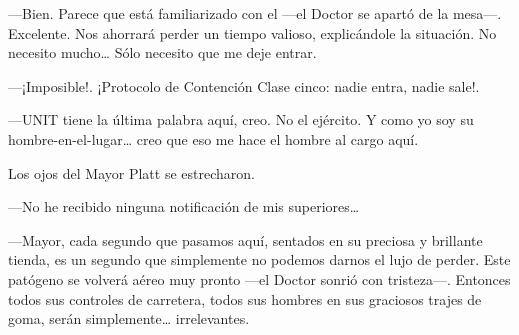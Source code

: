 ---Bien. Parece que está familiarizado con el ---el Doctor se apartó de
la mesa---. Excelente. Nos ahorrará perder un tiempo valioso,
explicándole la situación. No necesito mucho\ldots{} Sólo necesito que
me deje entrar.

---¡Imposible!. ¡Protocolo de Contención Clase cinco: nadie entra, nadie
sale!.

---UNIT tiene la última palabra aquí, creo. No el ejército. Y como yo
soy su hombre-en-el-lugar\ldots{} creo que eso me hace el hombre al
cargo aquí.

Los ojos del Mayor Platt se estrecharon.

---No he recibido ninguna notificación de mis superiores\ldots{}

---Mayor, cada segundo que pasamos aquí, sentados en su preciosa y
brillante tienda, es un segundo que simplemente no podemos darnos el
lujo de perder. Este patógeno se volverá aéreo muy pronto ---el Doctor
sonrió con tristeza---. Entonces todos sus controles de carretera, todos
sus hombres en sus graciosos trajes de goma, serán simplemente\ldots{}
irrelevantes.